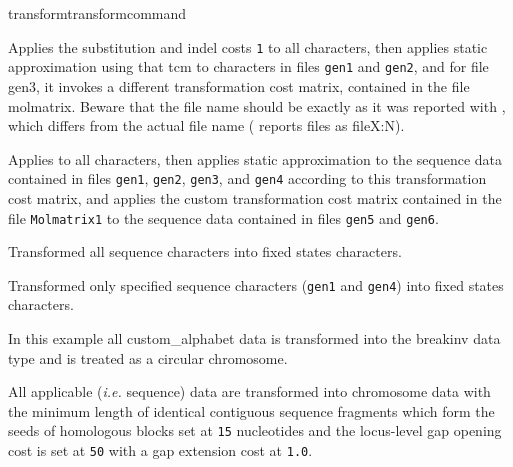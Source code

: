 \begin{command}{transform}{transformcommand}
\begin{poyexamples}
            	{Applies the substitution and indel costs \texttt{1} to all characters, then applies static approximation
            	using that tcm to characters in files \texttt{gen1} and \texttt{gen2}, and for file
            	gen3, it invokes a different transformation cost matrix, contained
            	in the file molmatrix. Beware that the file name should be exactly
            	as it was reported with , which differs from the actual
            	file name ( reports files as fileX:N).}

            	{Applies  to all characters, then applies
            	static approximation to the sequence data contained in files \texttt{gen1}, \texttt{gen2},
            	\texttt{gen3}, and \texttt{gen4} according to this transformation cost
            	matrix, and applies the custom transformation cost matrix contained in the file
            	\texttt{Molmatrix1} to the sequence data contained in files \texttt{gen5} and
            	\texttt{gen6}.}
         
        		 {Transformed all sequence characters into fixed states characters.}
            
           	{Transformed only specified sequence characters (\texttt{gen1} and
           	\texttt{gen4}) into fixed states characters.}
           
           	{In this example all custom\_alphabet data is transformed into the breakinv data type 
		and is treated as a circular chromosome.}
          
          	{All applicable (\emph{i.e.} sequence) data are transformed into chromosome
          	data with the minimum length of identical contiguous sequence fragments which form
	          the seeds of homologous blocks set at  \texttt{15} nucleotides and the locus-level gap
	         opening cost is set at \texttt{50} with a gap extension cost at \texttt{1.0}.}
              

\end{poyexamples}
\end{command}
